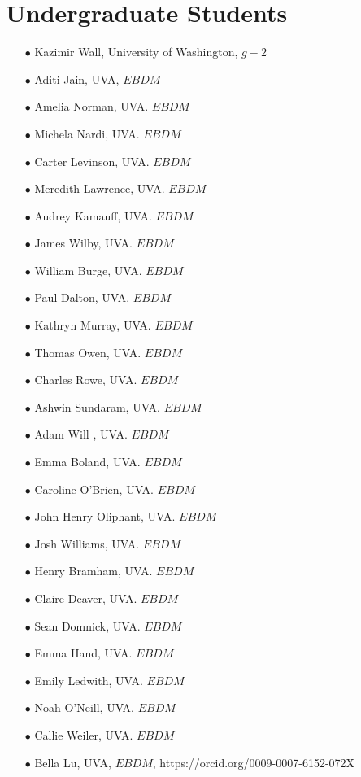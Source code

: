 \documentclass{article}[10pt]
\begin{document}
\section*{Undergraduate Students} %
\begin{itemize}
\item [$\bullet$] Kazimir Wall, University of Washington,  $g-2$
\item [$\bullet$] Aditi Jain, UVA,  $EBDM$
\item [$\bullet$] Amelia Norman, UVA. $EBDM$
\item [$\bullet$] Michela Nardi, UVA. $EBDM$
\item [$\bullet$] Carter Levinson, UVA. $EBDM$
\item [$\bullet$] Meredith Lawrence, UVA. $EBDM$
\item [$\bullet$] Audrey Kamauff, UVA. $EBDM$
\item [$\bullet$] James Wilby, UVA. $EBDM$
\item [$\bullet$] William Burge, UVA. $EBDM$
\item [$\bullet$] Paul Dalton, UVA. $EBDM$
\item [$\bullet$] Kathryn Murray, UVA. $EBDM$
\item [$\bullet$] Thomas Owen, UVA. $EBDM$
\item [$\bullet$] Charles Rowe, UVA. $EBDM$
\item [$\bullet$] Ashwin Sundaram, UVA. $EBDM$
\item [$\bullet$] Adam Will , UVA. $EBDM$
\item [$\bullet$] Emma Boland, UVA. $EBDM$
\item [$\bullet$] Caroline O’Brien, UVA. $EBDM$
\item [$\bullet$] John Henry Oliphant, UVA. $EBDM$
\item [$\bullet$] Josh Williams, UVA. $EBDM$
\item [$\bullet$] Henry Bramham, UVA. $EBDM$
\item [$\bullet$] Claire Deaver, UVA. $EBDM$
\item [$\bullet$] Sean Domnick, UVA. $EBDM$
\item [$\bullet$] Emma Hand, UVA. $EBDM$
\item [$\bullet$] Emily Ledwith, UVA. $EBDM$
\item [$\bullet$] Noah O’Neill, UVA. $EBDM$
\item [$\bullet$] Callie Weiler, UVA. $EBDM$
\item [$\bullet$] Bella Lu, UVA, $EBDM$, https://orcid.org/0009-0007-6152-072X

\end{itemize}
\end{document}
